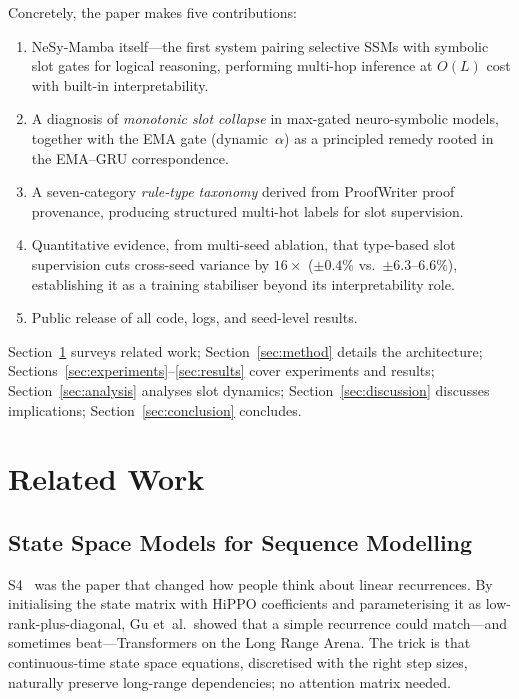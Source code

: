 \documentclass[conference]{IEEEtran}
\DeclareRobustCommand{\model}{NeSy-Mamba}
\begin{document}
Concretely, the paper makes five contributions:
\begin{enumerate}[nosep]
    \item \model{} itself---the first system pairing selective SSMs
          with symbolic slot gates for logical reasoning, performing
          multi-hop inference at $O(L)$ cost with built-in
          interpretability.
    \item A diagnosis of \emph{monotonic slot collapse} in max-gated
          neuro-symbolic models, together with the EMA gate
          (dynamic~$\alpha$) as a principled remedy rooted in the
          EMA--GRU correspondence.
    \item A seven-category \emph{rule-type taxonomy} derived from
          ProofWriter proof provenance, producing structured
          multi-hot labels for slot supervision.
    \item Quantitative evidence, from multi-seed ablation, that
          type-based slot supervision cuts cross-seed variance by
          $16\times$ ($\pm 0.4$\% vs.\ $\pm 6.3$--$6.6$\%),
          establishing it as a training stabiliser beyond its
          interpretability role.
    \item Public release of all code, logs, and seed-level results.
\end{enumerate}

Section~\ref{sec:related} surveys related work;
Section~\ref{sec:method} details the architecture;
Sections~\ref{sec:experiments}--\ref{sec:results} cover
experiments and results; Section~\ref{sec:analysis} analyses
slot dynamics; Section~\ref{sec:discussion} discusses
implications; Section~\ref{sec:conclusion} concludes.


\section{Related Work}
\label{sec:related}

\subsection{State Space Models for Sequence Modelling}

S4~\cite{gu2022s4} was the paper that changed how people think about
linear recurrences. By initialising the state matrix with HiPPO
coefficients and parameterising it as low-rank-plus-diagonal, Gu
et~al.\ showed that a simple recurrence could match---and sometimes
beat---Transformers on the Long Range Arena. The trick is that
continuous-time state space equations, discretised with the right
step sizes, naturally preserve long-range dependencies; no attention
matrix needed.
\end{document}

